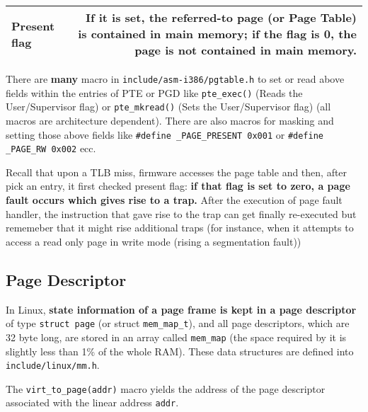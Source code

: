 \documentclass[10pt,a4paper]{article}
\begin{document}
\begin{center}
\begin{tabular}{lr} 
\toprule
 
\textbf{Present flag} & If it is set, the referred-to page (or Page Table) is contained in main memory; if the flag is 0, the page is not contained in main memory. \\ 




\bottomrule
\end{tabular}
\end{center}






There are \textbf{many} macro in \texttt{include/asm-i386/pgtable.h} to set or read above fields within the entries of PTE or PGD like \texttt{pte\_exec()} (Reads the User/Supervisor flag) or \texttt{pte\_mkread()} (Sets the User/Supervisor flag) (all macros are architecture dependent). There are also macros for masking and setting those above fields like \texttt{\#define \_PAGE\_PRESENT 0x001} or \texttt{\#define \_PAGE\_RW 0x002} ecc.

Recall that upon a TLB miss, firmware accesses the page table and then, after pick an entry, it first checked present flag: \textbf{if that flag is set to zero, a page fault occurs which gives rise to a trap.} After the execution of page fault handler, the instruction that gave rise to the trap can get finally re-executed but rememeber that it might rise additional traps (for instance, when it attempts to access a read only page in write mode (rising a segmentation fault))






\subsection{Page Descriptor}

In Linux, \textbf{state information of a page frame is kept in a page descriptor} of type \texttt{struct page} (or struct \texttt{mem\_map\_t}), and all page descriptors, which are 32 byte long, are stored in an array called \texttt{mem\_map} (the space required by it is slightly less than 1\% of the whole RAM). These data structures are defined into \texttt{include/linux/mm.h}. 

The \texttt{virt\_to\_page(addr)} macro yields the address of the page descriptor associated with the linear address \texttt{addr}. 
\end{document}
